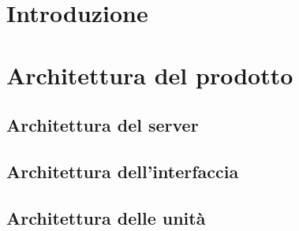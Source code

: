 \documentclass[]{article}
\begin{document}
	
	\newpage
	\tableofcontents
	\newpage
	\listoffigures
	\listoftables
	\newpage

	\section{Introduzione}
	
	\newpage

	\section{Architettura del prodotto}
	
	\newpage
	
	\subsection{Architettura del server}
	
	\newpage
	
	\subsection{Architettura dell'interfaccia}
	
	\newpage
	
	\subsection{Architettura delle unità}
	
	\newpage
	
\end{document}
